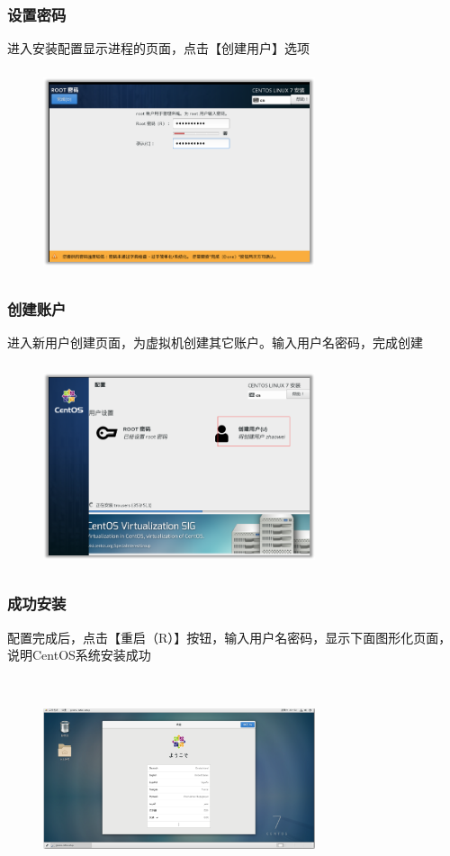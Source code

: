 \documentclass[notheorems,serif]{beamer}
\begin{document}
\begin{frame}
\frametitle{设置密码}
进入安装配置显示进程的页面，点击【创建用户】选项
\begin{figure}
 \centering
 \includegraphics[width=8cm,height=6cm]{./figures/图片33.png}
\end{figure}
\end{frame}

\begin{frame}
\frametitle{创建账户}
进入新用户创建页面，为虚拟机创建其它账户。输入用户名密码，完成创建
\begin{figure}
 \centering
 \includegraphics[width=8cm,height=6cm]{./figures/图片34.png}
\end{figure}
\end{frame}

\begin{frame}
\frametitle{成功安装}
配置完成后，点击【重启（R）】按钮，输入用户名密码，显示下面图形化页面，说明CentOS系统安装成功
\begin{figure}
 \centering
 \includegraphics[width=8cm,height=6cm]{./figures/图片35.png}
\end{figure}
\end{frame}
\end{document}

